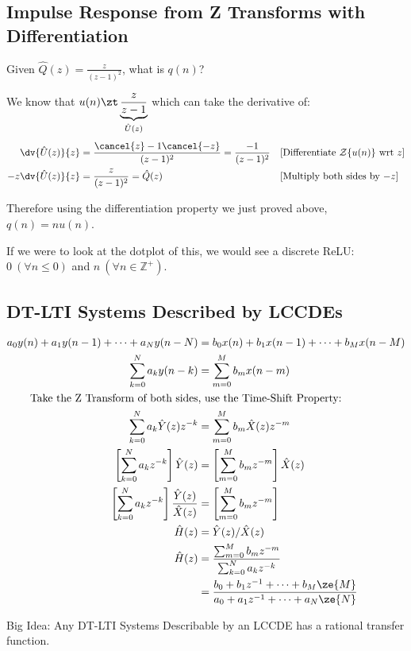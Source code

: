 \subsection{Impulse Response from Z Transforms with Differentiation}
Given $\hat Q(z)=\frac z{(z-1)^2}$, what is $q(n)$?

We know that $u(n)\zt \underbrace{\frac{z}{z-1}}_{\hat U(z)}$ which can take the derivative of:
\begin{align*}
    \dv{\hat U(z)}{z} &= \frac{\cancel{z}-1\cancel{-z}}{(z-1)^2}=\frac{-1}{(z-1)^2}
    &&\text{[Differentiate $\mathcal Z\{u(n)\}$ wrt $z$]}
    \\
    -z\dv{\hat U(z)}{z} &= \frac{z}{(z-1)^2} = \hat Q(z)
    &&\text{[Multiply both sides by $-z$]}
\end{align*}

Therefore using the differentiation property we just proved above, $q(n)=n u(n)$.

If we were to look at the dotplot of this, we would see a discrete ReLU: $0\ (\forall n\le0)$ and $n\ (\forall n\in\mathbb Z^+)$.

\subsection{DT-LTI Systems Described by LCCDEs}
\begin{align*}
    a_0 y(n) + a_1 y(n-1) + \cdots + a_N y(n-N)
    &=
    b_0 x(n) + b_1 x(n-1) + \cdots + b_M x(n-M)
    \\
    \sum_{k=0}^N a_k y(n-k)
    &= \sum_{m=0}^M b_m x(n-m)
    \\
    \text{Take the Z Transform of both sides}&\text{, use the Time-Shift Property:}
    \\
    \sum_{k=0}^N a_k \hat Y(z) z^{-k}
    &= \sum_{m=0}^M b_m \hat X(z) z^{-m}
    \\
    \left[\sum_{k=0}^N a_k z^{-k}\right] \hat Y(z)
    &= 
    \left[\sum_{m=0}^M b_m z^{-m}\right] \hat X(z)
    \\
    \left[\sum_{k=0}^N a_k z^{-k}\right] \frac{\hat Y(z)}{\hat X(z)}
    &= 
    \left[\sum_{m=0}^M b_m z^{-m}\right]
    \\
    \hat H(z)
    &=\hat Y(z)/\hat X(z)
    \\
    \hat H(z)
    &= 
    \frac{\sum_{m=0}^M b_m z^{-m}}
         {\sum_{k=0}^N a_k z^{-k}}
    \\
    &= 
    \frac{b_0 + b_1 z^{-1} + \cdots + b_M \ze{M}}
         {a_0 + a_1 z^{-1} + \cdots + a_N \ze{N}}
\end{align*}
\begin{shaded}
Big Idea: Any DT-LTI Systems Describable by an LCCDE has a rational transfer function.
\end{shaded}

